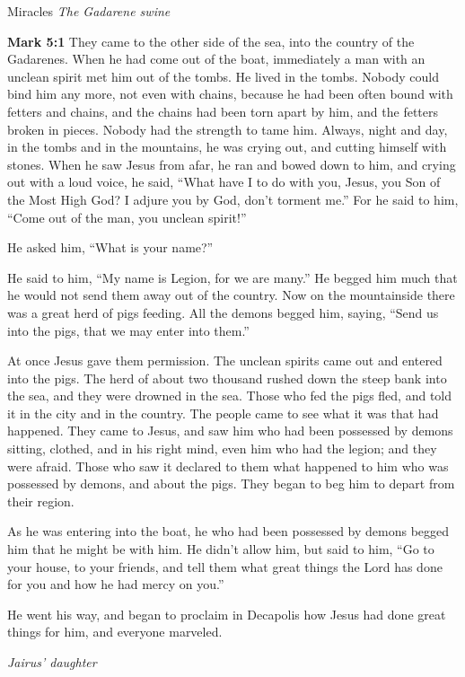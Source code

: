 \documentclass[10pt,twoside]{article} %
\newcommand{\quotesize}{\normalsize{}}
\newenvironment{quotetext}{\begingroup\quotesize}{\endgroup}
\newcommand{\bible}[2]{\begin{quotetext}\textbf{#1} #2\end{quotetext}}
\newcommand{\gospelmark}[2]{\bible{Mark #1}{#2}}
\newcommand{\subhead}[1]{\emph{#1}\par}
\begin{document}
\begin{section}{Miracles}
\subhead{The Gadarene swine}
\gospelmark{5:1}{
   They came to the other side of the sea, into the country of the Gadarenes.   When he had come out of the boat, immediately a man with an unclean spirit met him out of the tombs.   He lived in the tombs. Nobody could bind him any more, not even with chains,   because he had been often bound with fetters and chains, and the chains had been torn apart by him, and the fetters broken in pieces. Nobody had the strength to tame him.   Always, night and day, in the tombs and in the mountains, he was crying out, and cutting himself with stones.   When he saw Jesus from afar, he ran and bowed down to him,   and crying out with a loud voice, he said, ``What have I to do with you, Jesus, you Son of the Most High God? I adjure you by God, don't torment me.''   For he said to him, ``Come out of the man, you unclean spirit!''

  He asked him, ``What is your name?''

He said to him, ``My name is Legion, for we are many.''   He begged him much that he would not send them away out of the country.   Now on the mountainside there was a great herd of pigs feeding.   All the demons begged him, saying, ``Send us into the pigs, that we may enter into them.''

  At once Jesus gave them permission. The unclean spirits came out and entered into the pigs. The herd of about two thousand rushed down the steep bank into the sea, and they were drowned in the sea.   Those who fed the pigs fled, and told it in the city and in the country.
The people came to see what it was that had happened.   They came to Jesus, and saw him who had been possessed by demons sitting, clothed, and in his right mind, even him who had the legion; and they were afraid.   Those who saw it declared to them what happened to him who was possessed by demons, and about the pigs.   They began to beg him to depart from their region.

  As he was entering into the boat, he who had been possessed by demons begged him that he might be with him.   He didn't allow him, but said to him, ``Go to your house, to your friends, and tell them what great things the Lord has done for you and how he had mercy on you.''

  He went his way, and began to proclaim in Decapolis how Jesus had done great things for him, and everyone marveled.
}

\subhead{Jairus' daughter}


\end{section}
\end{document}
